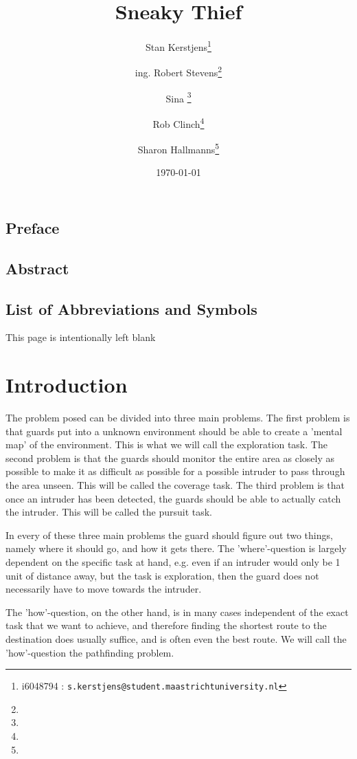 \documentclass{report}
\title{Sneaky Thief}
\author{Stan Kerstjens\thanks{i6048794 : \texttt{s.kerstjens@student.maastrichtuniversity.nl}}}
\author{ing. Robert Stevens\thanks{}} %
\author{Sina \thanks{}} %
\author{Rob Clinch\thanks{}}
\author{Sharon Hallmanns\thanks{}} %
\affil{Department of Knowledge Engineering, Maastricht University}
\date{\today}
\begin{document}
\maketitle
{}
\section*{Preface}
\section*{Abstract}
\listoffigures
\section*{List of Abbreviations and Symbols}
\tableofcontents\newpage



\newpage
\begin{center} This page is intentionally left blank \end{center}
\newpage

\chapter{Introduction}




	The problem posed can be divided into three main problems. The first problem is that guards put into a unknown environment should be able to create a 'mental map' of the environment. This is what we will call the exploration task. The second problem is that the guards should monitor the entire area as closely as possible to make it as difficult as possible for a possible intruder to pass through the area unseen. This will be called the coverage task. The third problem is that once an intruder has been detected, the guards should be able to actually catch the intruder. This will be called the pursuit task.

	In every of these three main problems the guard should figure out two things, namely where it should go, and how it gets there. The 'where'-question is largely dependent on the specific task at hand, e.g. even if an intruder would only be 1 unit of distance away, but the task is exploration, then the guard does not necessarily have to move towards the intruder.

	The 'how'-question, on the other hand, is in many cases independent of the exact task that we want to achieve, and therefore finding the shortest route to the destination does usually suffice, and is often even the best route. We will call the 'how'-question the pathfinding problem.
\end{document}

